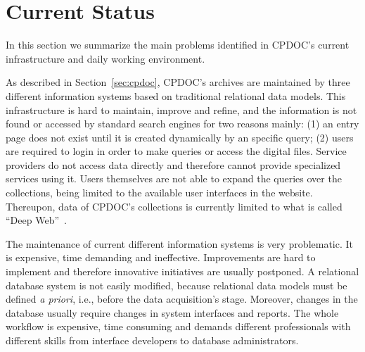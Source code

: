 
\section{Current Status}\label{sec:problems}

In this section we summarize the main problems identified in CPDOC's
current infrastructure and daily working environment.

As described in Section~\ref{sec:cpdoc}, CPDOC's archives are
maintained by three different information systems based on traditional
relational data models. This infrastructure is hard to maintain,
improve and refine, and the information is not found or
accessed by standard search engines for two reasons mainly: (1) an entry page
does not exist until it is created dynamically by an
specific query; (2) users are required to login in order to make
queries or access the digital files. Service providers do not access 
data directly and therefore cannot provide specialized services
using it. Users themselves are not able to expand the queries
over the collections, being limited to the available user interfaces in the website.
Thereupon, data of CPDOC's collections  is
currently limited to what is called ``Deep
Web''~\cite{bergman2001white}.



The maintenance of current different information systems is very problematic. It is expensive, time
demanding and ineffective. Improvements are hard to implement and
therefore innovative initiatives are usually postponed. A relational database system is not easily modified,
because relational data models must be defined \emph{a
  priori}, i.e., before the data acquisition's stage. Moreover,
changes in the database usually require changes in system interfaces and reports. The whole workflow is expensive, time
consuming and demands different professionals with different
skills from interface developers to database administrators.

